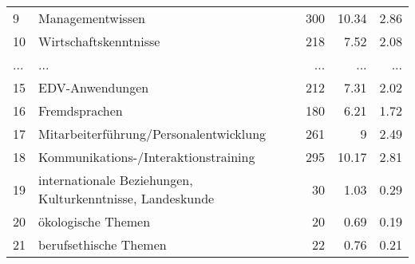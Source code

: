 \begin{longtable}{lXrrr}
        9 & \multicolumn{1}{X}{Managementwissen} & %
          \num{300} &
          \num[round-mode=places,round-precision=2]{10.34} &
          \num[round-mode=places,round-precision=2]{2.86} \\
        10 & \multicolumn{1}{X}{Wirtschaftskenntnisse} & %
          \num{218} &
          \num[round-mode=places,round-precision=2]{7.52} &
          \num[round-mode=places,round-precision=2]{2.08} \\
       ... & ... & ... & ... & ... \\
        15 & \multicolumn{1}{X}{EDV-Anwendungen} & %
          \num{212} &
          \num[round-mode=places,round-precision=2]{7.31} &
          \num[round-mode=places,round-precision=2]{2.02} \\

        16 & \multicolumn{1}{X}{Fremdsprachen} & %
          \num{180} &
          \num[round-mode=places,round-precision=2]{6.21} &
          \num[round-mode=places,round-precision=2]{1.72} \\

        17 & \multicolumn{1}{X}{Mitarbeiterführung/Personalentwicklung} & %
          \num{261} &
          \num[round-mode=places,round-precision=2]{9} &
          \num[round-mode=places,round-precision=2]{2.49} \\

        18 & \multicolumn{1}{X}{Kommunikations-/Interaktionstraining} & %
          \num{295} &
          \num[round-mode=places,round-precision=2]{10.17} &
          \num[round-mode=places,round-precision=2]{2.81} \\

        19 & \multicolumn{1}{X}{internationale Beziehungen, Kulturkenntnisse, Landeskunde} & %
          \num{30} &
          \num[round-mode=places,round-precision=2]{1.03} &
          \num[round-mode=places,round-precision=2]{0.29} \\

        20 & \multicolumn{1}{X}{ökologische Themen} & %
          \num{20} &
          \num[round-mode=places,round-precision=2]{0.69} &
          \num[round-mode=places,round-precision=2]{0.19} \\

        21 & \multicolumn{1}{X}{berufsethische Themen} & %
          \num{22} &
          \num[round-mode=places,round-precision=2]{0.76} &
          \num[round-mode=places,round-precision=2]{0.21} \\


\end{longtable}
